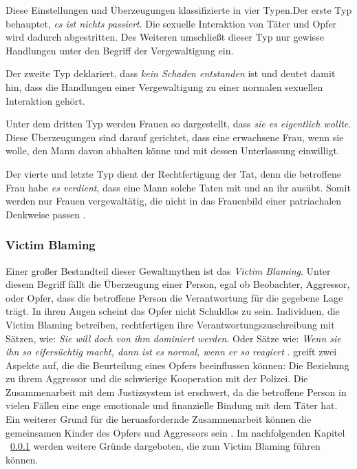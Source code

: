 Diese Einstellungen und Überzeugungen klassifizierte \textcite{Vergewaltigung_Typen_Burt_1991} in vier Typen.Der erste Typ behauptet, \textit{es ist nichts passiert}. Die sexuelle Interaktion von Täter und Opfer wird dadurch abgestritten. Des Weiteren umschließt dieser Typ nur gewisse Handlungen unter den Begriff der Vergewaltigung ein. 

Der zweite Typ deklariert, dass \textit{kein Schaden entstanden} ist und deutet damit hin, dass die Handlungen einer Vergewaltigung zu einer normalen sexuellen Interaktion gehört.

Unter dem dritten Typ werden Frauen so dargestellt, dass \textit{sie es eigentlich wollte}. Diese Überzeugungen sind darauf gerichtet, dass eine erwachsene Frau, wenn sie wolle, den Mann davon abhalten könne und mit dessen Unterlassung einwilligt.

Der vierte und letzte Typ dient der Rechtfertigung der Tat, denn die betroffene Frau habe \textit{es verdient}, dass eine Mann solche Taten mit und an ihr ausübt. Somit werden nur Frauen vergewaltätig, die nicht in das Frauenbild einer patriachalen Denkweise passen \parencite{Vergewaltigung_Typen_Burt_1991}.


\subsubsection{Victim Blaming}     \label{2.1.3.2}
Einer großer Bestandteil dieser Gewaltmythen ist das \textit{Victim Blaming}. Unter diesem Begriff fällt die Überzeugung einer Person, egal ob Beobachter, Aggressor, oder Opfer, dass die betroffene Person die Verantwortung für die gegebene Lage trägt. In ihren Augen scheint das Opfer nicht Schuldlos zu sein. Individuen, die Victim Blaming betreiben, rechtfertigen ihre Verantwortungszuschreibung mit Sätzen, wie: \textit{Sie will doch von ihm dominiert werden}. Oder Sätze wie: \textit{Wenn sie ihn so eifersüchtig macht, dann ist es normal, wenn er so reagiert} \parencite{Peters2003}. \textcite{victim_blaming} greift zwei Aspekte auf, die die Beurteilung eines Opfers beeinflussen können: Die Beziehung zu ihrem Aggressor und die schwierige Kooperation mit der Polizei. Die Zusammenarbeit mit dem Justizsystem ist erschwert, da die betroffene Person in vielen Fällen eine enge emotionale und finanzielle Bindung mit dem Täter hat. Ein weiterer Grund für die heruasfordernde Zusammenarbeit können die gemeinsamen Kinder des Opfers und Aggressors sein \parencite{victim_blaming}. Im nachfolgenden Kapitel ~\ref{2.1.3.2} werden weitere Gründe dargeboten, die zum Victim Blaming führen können.


